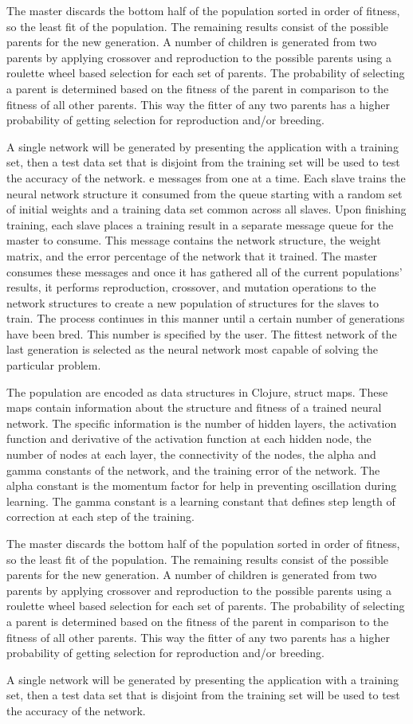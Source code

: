 The master discards the bottom half of the population sorted in order of fitness, so the least fit of the population. The remaining results consist of the possible parents for the new generation. A number of children is generated from two parents by applying crossover and reproduction to the possible parents using a roulette wheel based selection for each set of parents. The probability of selecting a parent is determined based on the fitness of the parent in comparison to the fitness of all other parents. This way the fitter of any two parents has a higher probability of getting selection for reproduction and/or breeding.

A single network will be generated by presenting the application with a training set, then a test data set that is disjoint from the training set will be used to test the accuracy of the network.  
e messages from one at a time. Each slave trains the neural network structure it consumed from the queue starting with a random set of initial weights and a training data set common across all slaves. Upon finishing training, each slave places a training result in a separate message queue for the master to consume. This message contains the network structure, the weight matrix, and the error percentage of the network that it trained. The master consumes these messages and once it has gathered all of the current populations' results, it performs reproduction, crossover, and mutation operations to the network structures to create a new population of structures for the slaves to train. The process continues in this manner until a certain number of generations have been bred. This number is specified by the user. The fittest network of the last generation is selected as the neural network most capable of solving the particular problem.  

The population are encoded as data structures in Clojure, struct maps. These maps contain information about the structure and fitness of a trained neural network. The specific information is the number of hidden layers, the activation function and derivative of the activation function at each hidden node, the number of nodes at each layer, the connectivity of the nodes, the alpha and gamma constants of the network, and the training error of the network. The alpha constant is the momentum factor for help in preventing oscillation during learning. The gamma constant is a learning constant that defines step length of correction at each step of the training.

The master discards the bottom half of the population sorted in order of fitness, so the least fit of the population. The remaining results consist of the possible parents for the new generation. A number of children is generated from two parents by applying crossover and reproduction to the possible parents using a roulette wheel based selection for each set of parents. The probability of selecting a parent is determined based on the fitness of the parent in comparison to the fitness of all other parents. This way the fitter of any two parents has a higher probability of getting selection for reproduction and/or breeding.

A single network will be generated by presenting the application with a training set, then a test data set that is disjoint from the training set will be used to test the accuracy of the network.  
